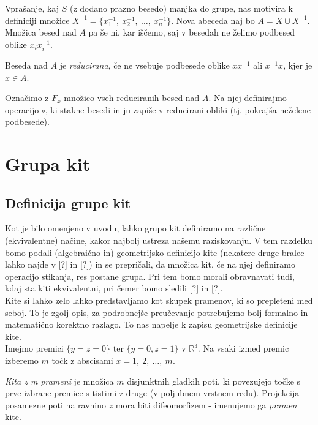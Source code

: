 \documentclass[mat1]{fmfdelo}
\newcommand{\R}{\mathbb R}
\begin{document}
Vprašanje, kaj $S$ (z dodano prazno besedo) manjka do grupe, nas motivira k definiciji množice $X^{-1} = \{x_1^{-1},\ x_2^{-1}, \ \ldots, \ x_n^{-1}\}$. Nova abeceda naj bo $A = X \cup X^{-1}$. Množica besed nad $A$ pa še ni, kar iščemo, saj v besedah ne želimo podbesed oblike $x_ix_i^{-1}$.

\begin{definicija}
Beseda nad $A$ je \emph{reducirana}, če ne vsebuje podbesede oblike $xx^{-1}$ ali $x^{-1}x$, kjer je $x\in A$.
\end{definicija}

Označimo z $F_x$ množico vseh reduciranih besed nad $A$. Na njej definirajmo operacijo $\circ$, ki stakne besedi in ju zapiše v reducirani obliki (tj. pokrajša neželene podbesede).



\section{Grupa kit}

\subsection{Definicija grupe kit}

Kot je bilo omenjeno v uvodu, lahko grupo kit definiramo na različne (ekvivalentne) načine, kakor najbolj ustreza našemu raziskovanju. V tem razdelku bomo podali (algebraično in) geometrijsko definicijo kite (nekatere druge bralec lahko najde v [?] in [?]) in se prepričali, da množica kit, če na njej definiramo operacijo stikanja, res postane grupa. Pri tem bomo morali obravnavati tudi, kdaj sta kiti ekvivalentni, pri čemer bomo sledili [?] in [?].\\
Kite si lahko zelo lahko predstavljamo kot skupek pramenov, ki so prepleteni med seboj. To je zgolj opis, za podrobnejše preučevanje potrebujemo bolj formalno in matematično korektno razlago. To nas napelje k zapisu geometrijske definicije kite.\\
Imejmo premici $\{y = z = 0\}$ ter $\{y = 0, z = 1\}$ v $\R^3$. Na vsaki izmed premic izberemo $m$ točk z abscisami $x=1,\ 2,\ \ldots,\ m$.

\begin{definicija}
\emph{Kita z m prameni} je množica $m$ disjunktnih gladkih poti, ki povezujejo točke s prve izbrane premice s tistimi z druge (v poljubnem vrstnem redu). Projekcija posamezne poti na ravnino $z$ mora biti difeomorfizem - imenujemo ga \emph{pramen} kite.
\end{definicija}
\end{document}
